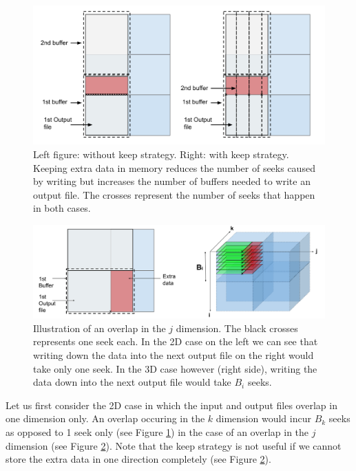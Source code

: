 \documentclass[conference]{IEEEtran}
\begin{document}
\begin{figure}[h]
\centering
\includegraphics[scale=0.20]{./figures/case_1_2.png}
\caption{Left figure: without keep strategy.
Right: with keep strategy.
Keeping extra data in memory reduces the number of seeks caused by writing but increases the number of buffers needed to write an output file.
The crosses represent the number of seeks that happen in both cases.
}
\label{fig:case_1_2}
\end{figure}

\begin{figure}[h]
\centering
\includegraphics[scale=0.20]{./figures/case_2_1.png}
\caption{Illustration of an overlap in the $j$ dimension. The black crosses represents one seek each. In the 2D case on the left we can see that writing down the data into the next output file on the right would take only one seek. In the 3D case however (right side), writing the data down into the next output file would take $B_i$ seeks.
}
\label{fig:case_2_1}
\end{figure}

Let us first consider the 2D case in which the input and output files overlap in one dimension only.
An overlap occuring in the $k$ dimension would incur $B_k$ seeks as opposed to 1 seek only (see Figure \ref{fig:case_1_2}) in the case of an overlap in the $j$ dimension (see Figure \ref{fig:case_2_1}).
Note that the keep strategy is not useful if we cannot store the extra data in one direction completely (see Figure \ref{fig:case_2_1}). \\
\end{document}
